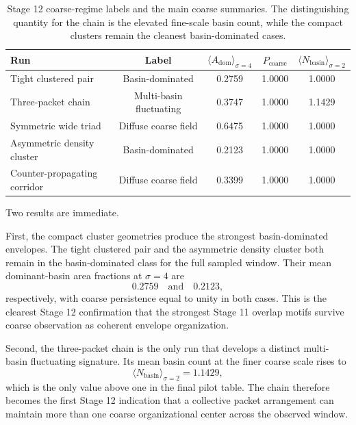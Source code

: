 \documentclass[11pt]{article}
\begin{document}
\begin{table}[t]
\centering
\begin{tabular}{lcccc}
\hline
Run & Label & $\langle A_{\mathrm{dom}}\rangle_{\sigma=4}$ & $P_{\mathrm{coarse}}$ & $\langle N_{\mathrm{basin}}\rangle_{\sigma=2}$ \\
\hline
Tight clustered pair & Basin-dominated & 0.2759 & 1.0000 & 1.0000 \\
Three-packet chain & Multi-basin fluctuating & 0.3747 & 1.0000 & 1.1429 \\
Symmetric wide triad & Diffuse coarse field & 0.6475 & 1.0000 & 1.0000 \\
Asymmetric density cluster & Basin-dominated & 0.2123 & 1.0000 & 1.0000 \\
Counter-propagating corridor & Diffuse coarse field & 0.3399 & 1.0000 & 1.0000 \\
\hline
\end{tabular}
\caption{Stage 12 coarse-regime labels and the main coarse summaries. The distinguishing quantity for the chain is the elevated fine-scale basin count, while the compact clusters remain the cleanest basin-dominated cases.}
\label{tab:stage12-results}
\end{table}

Two results are immediate.

First, the compact cluster geometries produce the strongest basin-dominated envelopes. The tight clustered pair and the asymmetric density cluster both remain in the basin-dominated class for the full sampled window. Their mean dominant-basin area fractions at $\sigma=4$ are
\begin{equation}
0.2759 \quad \text{and} \quad 0.2123,
\end{equation}
respectively, with coarse persistence equal to unity in both cases. This is the clearest Stage 12 confirmation that the strongest Stage 11 overlap motifs survive coarse observation as coherent envelope organization.

Second, the three-packet chain is the only run that develops a distinct multi-basin fluctuating signature. Its mean basin count at the finer coarse scale rises to
\begin{equation}
\langle N_{\mathrm{basin}}\rangle_{\sigma=2} = 1.1429,
\end{equation}
which is the only value above one in the final pilot table. The chain therefore becomes the first Stage 12 indication that a collective packet arrangement can maintain more than one coarse organizational center across the observed window.
\end{document}
